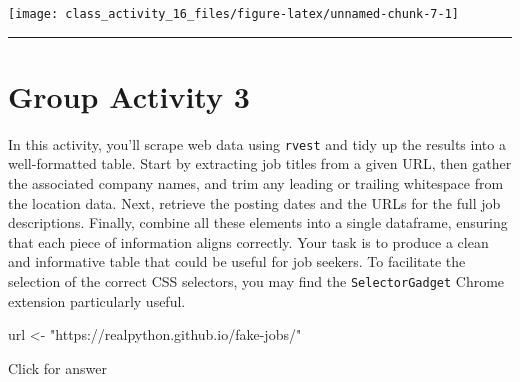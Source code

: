 \documentclass[
]{book}
\newenvironment{Shaded}{\begin{snugshade}}{\end{snugshade}}
\newcommand{\NormalTok}[1]{#1}
\newcommand{\OtherTok}[1]{\textcolor[rgb]{0.56,0.35,0.01}{#1}}
\newcommand{\StringTok}[1]{\textcolor[rgb]{0.31,0.60,0.02}{#1}}
\begin{document}
\texttt{[image: class\_activity\_16\_files/figure-latex/unnamed-chunk-7-1]}

\begin{center}\rule{0.5\linewidth}{0.5pt}\end{center}

\hypertarget{group-activity-3-1}{%
\section{Group Activity 3}\label{group-activity-3-1}}

In this activity, you'll scrape web data using \texttt{rvest} and tidy up the results into a well-formatted table. Start by extracting job titles from a given URL, then gather the associated company names, and trim any leading or trailing whitespace from the location data. Next, retrieve the posting dates and the URLs for the full job descriptions. Finally, combine all these elements into a single dataframe, ensuring that each piece of information aligns correctly. Your task is to produce a clean and informative table that could be useful for job seekers. To facilitate the selection of the correct CSS selectors, you may find the \texttt{SelectorGadget} Chrome extension particularly useful.

\begin{Shaded}
\begin{Highlighting}[]
\NormalTok{url }\OtherTok{\textless{}{-}} \StringTok{"https://realpython.github.io/fake{-}jobs/"}
\end{Highlighting}
\end{Shaded}

Click for answer
\end{document}

